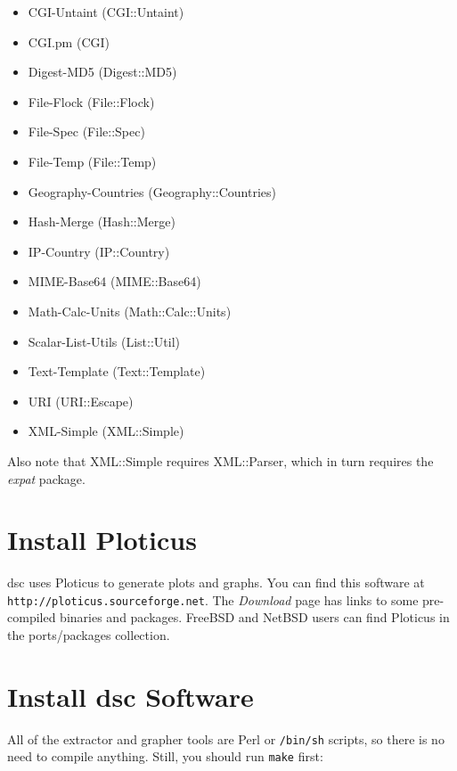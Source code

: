 \documentclass{report}
\def\dsc{{\sc dsc}}
\begin{document}
\begin{itemize}
\setlength{\itemsep}{0ex plus 0.5ex minus 0.0ex}
	\item CGI-Untaint (CGI::Untaint)
	\item CGI.pm (CGI)
	\item Digest-MD5 (Digest::MD5)
	\item File-Flock (File::Flock)
	\item File-Spec (File::Spec)
	\item File-Temp (File::Temp)
	\item Geography-Countries (Geography::Countries)
	\item Hash-Merge (Hash::Merge)
	\item IP-Country (IP::Country)
	\item MIME-Base64 (MIME::Base64)
	\item Math-Calc-Units (Math::Calc::Units)
	\item Scalar-List-Utils (List::Util)
	\item Text-Template (Text::Template)
	\item URI (URI::Escape)
	\item XML-Simple (XML::Simple)

\end{itemize}

\noindent
Also note that XML::Simple requires XML::Parser, which in
turn requires the {\em expat\/} package.

\section{Install Ploticus}

{\dsc} uses Ploticus to generate plots and graphs.  You can find
this software at \verb|http://ploticus.sourceforge.net|.  The {\em
Download\/} page has links to some pre-compiled binaries and packages.
FreeBSD and NetBSD users can find Ploticus in the ports/packages
collection.


\section{Install {\dsc} Software}

All of the extractor and grapher tools are Perl or {\tt /bin/sh}
scripts, so there is no need to compile anything.  Still,
you should run {\tt make} first:

\begin{MyVerbatim}
\end{MyVerbatim}
\end{document}
